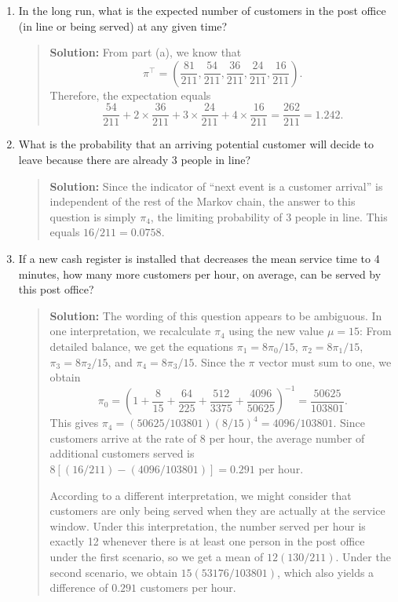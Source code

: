 \documentclass{article}
\begin{document}
\begin{enumerate}
\begin{enumerate}
\begin{enumerate}
      \end{enumerate}
      
    \item In the long run, what is the expected number of customers in the post
    office (in line or being served) at any given time?
    \begin{quotation}{\bf Solution:}
    From part (a), we know that 
    \[
    \pi^\top = \left( \frac{81}{211}, \frac{54}{211}, \frac{36}{211}, \frac{24}{211},
    \frac{16}{211} \right). 
    \]
    Therefore, the expectation equals
    \[
    \frac{54}{211} + 2\times \frac{36}{211} + 3\times \frac{24}{211} 
    + 4\times \frac{16}{211} = \frac{262}{211} = 1.242.
    \]
    \end{quotation}
    
    \item What is the probability that an arriving potential customer will
    decide to leave because there are already 3 people in line?
    \begin{quotation}{\bf Solution:}
    Since the indicator of ``next event is a customer arrival'' is independent of the
    rest of the Markov chain, the answer to this question is simply
    $\pi_4$, the limiting probability of 3 people in line.  This equals $16/211=0.0758$.
    \end{quotation}
    
    \item If a new cash register is installed that decreases the mean service
    time to 4 minutes, how many more customers per hour, on average, can be
    served by this post office?
    \begin{quotation}{\bf Solution:}
    The wording of this question appears to be ambiguous.  In one interpretation, we recalculate
    $\pi_4$ using the new value $\mu=15$:
      From detailed balance, we get the equations
      $\pi_1 = 8\pi_0/15$, 
      $\pi_2 = 8\pi_1/15$, 
      $\pi_3 = 8\pi_2/15$, and 
      $\pi_4 = 8\pi_3/15$.  Since the $\pi$ vector must sum to one, we obtain
      \[
      \pi_0 = \left( 1 + \frac8{15} + \frac{64}{225} + \frac{512}{3375} + \frac{4096}{50625}\right)^{-1} 
      = \frac{50625}{103801}.
      \]
      This gives $\pi_4=(50625/103801)(8/15)^4 = 4096/103801$.  Since 
      customers arrive at the rate of 8 per hour, the average number of additional customers
      served is $8[(16/211) - (4096/103801)]=0.291$ per hour. 
          
       According to a different interpretation, we might consider that customers are only being 
       served when they are actually at the service window.  Under this interpretation, the number
       served per hour is exactly 12 whenever there is at least one person in the post office
       under the first scenario, so we get a mean of
       $12(130/211)$.  Under the second scenario, we obtain 
       $15(53176/103801)$, which also yields a difference of
       $0.291$ customers per hour.  
       

\end{quotation}
\end{enumerate}
\end{enumerate}
\end{document}
